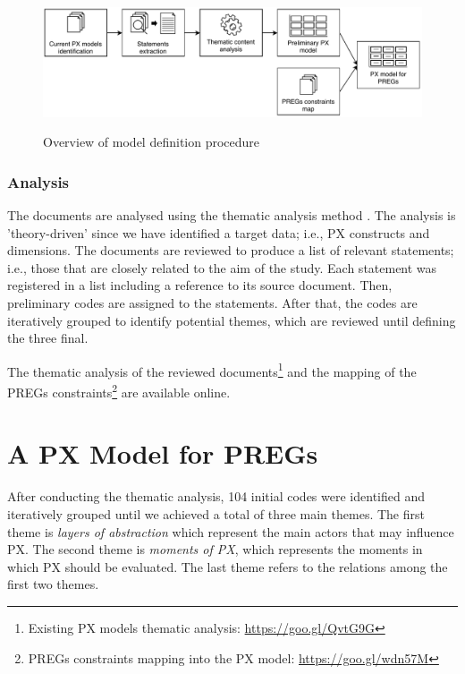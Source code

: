 \begin{figure}[bth]
\myfloatalign
{\includegraphics[width=\linewidth]{gfx/model/modelDefiniton}} \quad
\caption{Overview of model definition procedure}\label{fig:modelDefiniton}
\end{figure}

\subsubsection{Analysis}
The documents are analysed using the thematic analysis method \autocite{Braun}. The analysis is 'theory-driven' since we have identified a target data; i.e., \ac{PX} constructs and dimensions. The documents are reviewed to produce a list of relevant statements; i.e., those that are closely related to the aim of the study. Each statement was registered in a list including a reference to its source document. Then, preliminary codes are assigned to the statements. After that, the codes are iteratively grouped to identify potential themes, which are reviewed until defining the three final.

The thematic analysis of the reviewed documents\footnote{Existing PX models thematic analysis: \url{https://goo.gl/QvtG9G}} and the mapping of the \acp{PREG} constraints\footnote{PREGs constraints mapping into the PX model: \url{https://goo.gl/wdn57M}} are available online.

\section{A PX Model for PREGs} %
\label{sec:preg_px_model}
After conducting the thematic analysis, 104 initial codes were identified and iteratively grouped until we achieved a total of three main themes. The first theme is \textit{layers of abstraction} which represent the main actors that may influence \ac{PX}. The second theme is \textit{moments of \ac{PX}}, which represents the moments in which \ac{PX} should be evaluated. The last theme refers to the relations among the first two themes.

